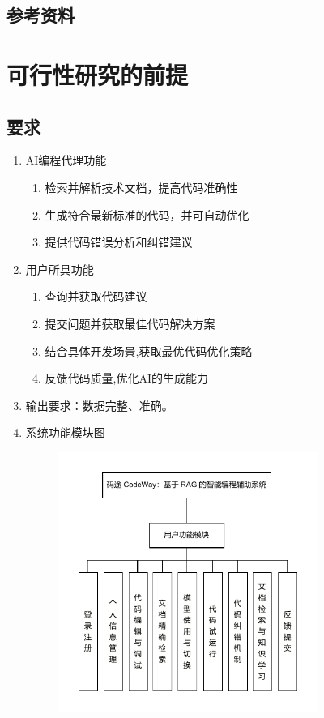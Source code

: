 \documentclass[
    report,     %
    oneside,    %
    UTF8,       %
    zihao=-4    %
]{config} %
\begin{document}
\subsection{参考资料}


\section{可行性研究的前提}
\subsection{要求}
\begin{enumerate}[label=(\arabic*)]
    \item AI编程代理功能
    \begin{enumerate}[label=(\alph*)]
        \item 检索并解析技术文档，提高代码准确性
        \item 生成符合最新标准的代码，并可自动优化
        \item 提供代码错误分析和纠错建议
    \end{enumerate}
    \item 用户所具功能
    \begin{enumerate}[label=(\alph*)]
        \item 查询并获取代码建议
        \item 提交问题并获取最佳代码解决方案
        \item 结合具体开发场景,获取最优代码优化策略
        \item 反馈代码质量,优化AI的生成能力
    \end{enumerate}
    \item 输出要求：数据完整、准确。
    \item 系统功能模块图
    \begin{figure}[h] %
    \centering %
    \includegraphics[width=0.8\textwidth]{figures/system-module.pdf}

\end{figure}
\end{enumerate}
\end{document}
